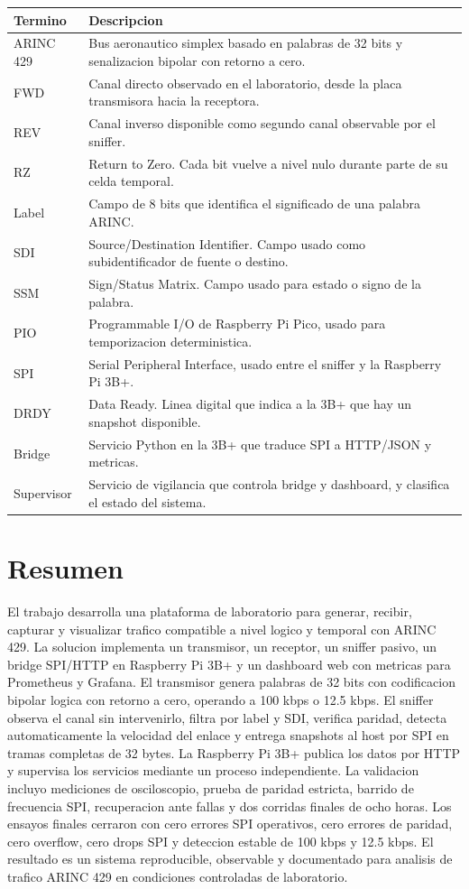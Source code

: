 \documentclass[12pt,a4paper,oneside]{report}
\begin{document}
\begin{longtable}{p{}p{}}
\toprule
\textbf{Termino} & \textbf{Descripcion} \\
\midrule
ARINC 429 & Bus aeronautico simplex basado en palabras de 32 bits y senalizacion bipolar con retorno a cero. \\
FWD & Canal directo observado en el laboratorio, desde la placa transmisora hacia la receptora. \\
REV & Canal inverso disponible como segundo canal observable por el sniffer. \\
RZ & Return to Zero. Cada bit vuelve a nivel nulo durante parte de su celda temporal. \\
Label & Campo de 8 bits que identifica el significado de una palabra ARINC. \\
SDI & Source/Destination Identifier. Campo usado como subidentificador de fuente o destino. \\
SSM & Sign/Status Matrix. Campo usado para estado o signo de la palabra. \\
PIO & Programmable I/O de Raspberry Pi Pico, usado para temporizacion deterministica. \\
SPI & Serial Peripheral Interface, usado entre el sniffer y la Raspberry Pi 3B+. \\
DRDY & Data Ready. Linea digital que indica a la 3B+ que hay un snapshot disponible. \\
Bridge & Servicio Python en la 3B+ que traduce SPI a HTTP/JSON y metricas. \\
Supervisor & Servicio de vigilancia que controla bridge y dashboard, y clasifica el estado del sistema. \\
\bottomrule
\end{longtable}

\chapter*{Resumen}

El trabajo desarrolla una plataforma de laboratorio para generar, recibir,
capturar y visualizar trafico compatible a nivel logico y temporal con ARINC
429. La solucion implementa un transmisor, un receptor, un sniffer pasivo, un
bridge SPI/HTTP en Raspberry Pi 3B+ y un dashboard web con metricas para
Prometheus y Grafana. El transmisor genera palabras de 32 bits con codificacion
bipolar logica con retorno a cero, operando a 100 kbps o 12.5 kbps. El sniffer
observa el canal sin intervenirlo, filtra por label y SDI, verifica paridad,
detecta automaticamente la velocidad del enlace y entrega snapshots al host por
SPI en tramas completas de 32 bytes. La Raspberry Pi 3B+ publica los datos por
HTTP y supervisa los servicios mediante un proceso independiente. La validacion
incluyo mediciones de osciloscopio, prueba de paridad estricta, barrido de
frecuencia SPI, recuperacion ante fallas y dos corridas finales de ocho horas.
Los ensayos finales cerraron con cero errores SPI operativos, cero errores de
paridad, cero overflow, cero drops SPI y deteccion estable de 100 kbps y 12.5
kbps. El resultado es un sistema reproducible, observable y documentado para
analisis de trafico ARINC 429 en condiciones controladas de laboratorio.
\end{document}
